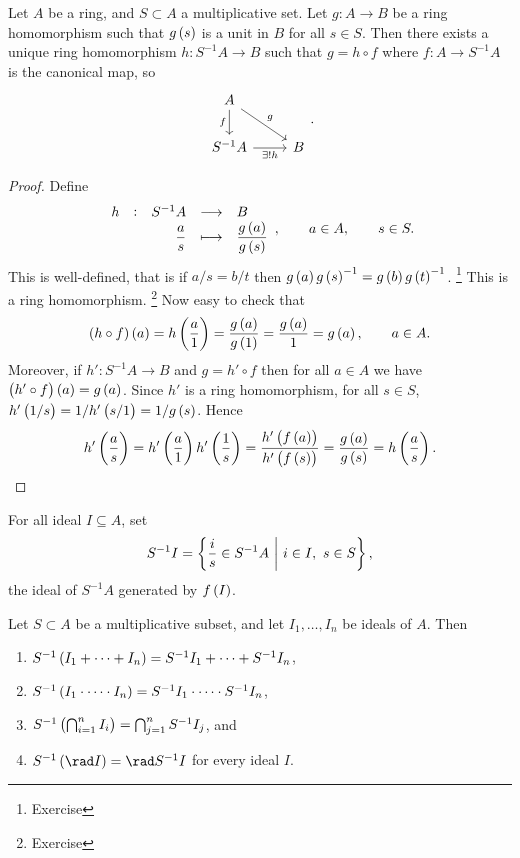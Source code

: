 
\begin{lemma}
Let $ A $ be a ring, and $ S \subset A $ a multiplicative set. Let $ g : A \to B $ be a ring homomorphism such that $ g\br{s} $ is a unit in $ B $ for all $ s \in S $. Then there exists a unique ring homomorphism $ h : S^{-1}A \to B $ such that $ g = h \circ f $ where $ f : A \to S^{-1}A $ is the canonical map, so
$$
\begin{tikzcd}
A \arrow[swap]{d}{f} \arrow{dr}{g} & \\
S^{-1}A \arrow[swap]{r}{\exists !h} & B
\end{tikzcd}.
$$
\end{lemma}

\pagebreak

\begin{proof}
Define
$$ \function[h]{S^{-1}A}{B}{\dfrac{a}{s}}{\dfrac{g\br{a}}{g\br{s}}}, \qquad a \in A, \qquad s \in S. $$
This is well-defined, that is if $ a / s = b / t $ then $ g\br{a}g\br{s}^{-1} = g\br{b}g\br{t}^{-1} $. \footnote{Exercise} This is a ring homomorphism. \footnote{Exercise} Now easy to check that
$$ \br{h \circ f}\br{a} = h\br{\dfrac{a}{1}} = \dfrac{g\br{a}}{g\br{1}} = \dfrac{g\br{a}}{1} = g\br{a}, \qquad a \in A. $$
Moreover, if $ h' : S^{-1}A \to B $ and $ g = h' \circ f $ then for all $ a \in A $ we have $ \br{h' \circ f}\br{a} = g\br{a} $. Since $ h' $ is a ring homomorphism, for all $ s \in S $, $ h'\br{1 / s} = 1 / h'\br{s / 1} = 1 / g\br{s} $. Hence
$$ h'\br{\dfrac{a}{s}} = h'\br{\dfrac{a}{1}}h'\br{\dfrac{1}{s}} = \dfrac{h'\br{f\br{a}}}{h'\br{f\br{s}}} = \dfrac{g\br{a}}{g\br{s}} = h\br{\dfrac{a}{s}}. $$
\end{proof}

For all ideal $ I \subseteq A $, set
$$ S^{-1}I = \cbr{\dfrac{i}{s} \in S^{-1}A \st i \in I, \ s \in S}, $$
the ideal of $ S^{-1}A $ generated by $ f\br{I} $.

\begin{proposition}
Let $ S \subset A $ be a multiplicative subset, and let $ I_1, \dots, I_n $ be ideals of $ A $. Then
\begin{enumerate}
\item $ S^{-1}\br{I_1 + \dots + I_n} = S^{-1}I_1 + \dots + S^{-1}I_n $,
\item $ S^{-1}\br{I_1 \cdot \dots \cdot I_n} = S^{-1}I_1 \cdot \dots \cdot S^{-1}I_n $,
\item $ S^{-1}\br{\bigcap_{i = 1}^n I_i} = \bigcap_{j = 1}^n S^{-1}I_j $, and
\item $ S^{-1}\br{\rad I} = \rad S^{-1}I $ for every ideal $ I $.
\end{enumerate}
\end{proposition}

